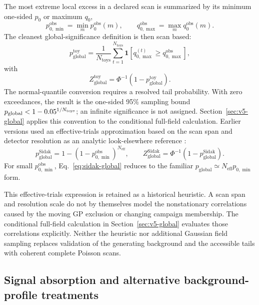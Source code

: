 The most extreme local excess in a declared scan is summarized by its minimum
one-sided $p_0$ or maximum $q_0$,
\begin{equation}
p_{0,\min}^{\mathrm{obs}} = \min_m p_0^{\mathrm{obs}}(m),
\qquad
q_{0,\max}^{\mathrm{obs}} = \max_m q_0^{\mathrm{obs}}(m).
\end{equation}
The cleanest global-significance definition is then scan based:
\begin{equation}
p_{\mathrm{global}}^{\mathrm{toy}}
=
\frac{1}{N_{\mathrm{toys}}}
\sum_{t=1}^{N_{\mathrm{toys}}}
\mathbf{1}\!\left[
q_{0,\max}^{(t)} \ge q_{0,\max}^{\mathrm{obs}}
\right],
\label{eq:pglobal-toy}
\end{equation}
with
\begin{equation}
Z_{\mathrm{global}}^{\mathrm{toy}} = \Phi^{-1}\!\left(1-p_{\mathrm{global}}^{\mathrm{toy}}\right).
\end{equation}
The normal-quantile conversion requires a resolved tail probability. With
zero exceedances, the result is the one-sided 95\% sampling bound
$p_{\rm global}<1-0.05^{1/N_{\rm toys}}$; an infinite significance is not
assigned. Section~\ref{sec:v5-global} applies this convention to the
conditional full-field calculation.
Earlier versions used an effective-trials approximation based on the scan span
and detector resolution as an analytic look-elsewhere reference \cite{GrossVitells2010}:
\begin{equation}
p_{\mathrm{global}}^{\mathrm{Sidak}}
=
1-\left(1-p_{0,\min}^{\mathrm{obs}}\right)^{N_{\mathrm{eff}}},
\qquad
Z_{\mathrm{global}}^{\mathrm{Sidak}}
=
\Phi^{-1}\!\left(1-p_{\mathrm{global}}^{\mathrm{Sidak}}\right).
\label{eq:sidak-global}
\end{equation}
For small $p_{0,\min}^{\mathrm{obs}}$, Eq.~\eqref{eq:sidak-global} reduces to the
familiar $p_{\mathrm{global}}\simeq N_{\mathrm{eff}}p_{0,\min}$ form.

This effective-trials expression is retained as a historical heuristic. A
scan span and resolution scale do not by themselves model the nonstationary
correlations caused by the moving GP exclusion or changing campaign membership.
The conditional full-field calculation in Section~\ref{sec:v5-global} evaluates
those correlations explicitly. Neither the heuristic nor additional Gaussian
field sampling replaces validation of the generating background and the
accessible tails with coherent complete Poisson scans.

\subsection{Signal absorption and alternative background-profile treatments}

